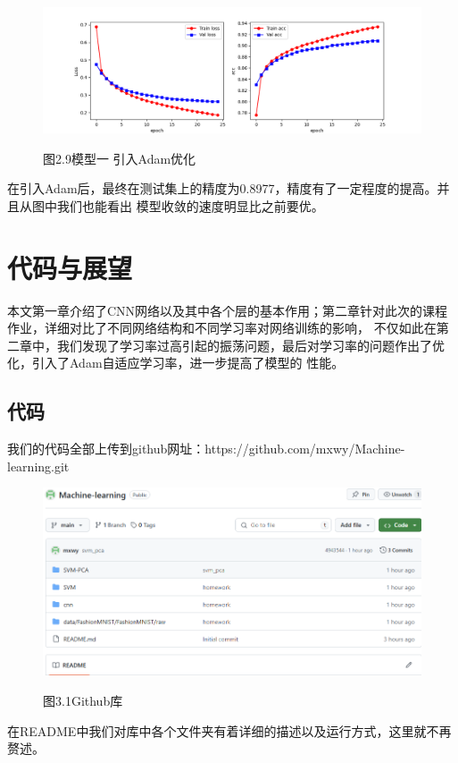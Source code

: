 \documentclass[10.5pt,compsoc,UTF8]{CjC}
\theoremstyle{mystyle}
\begin{document}
\begin{figure}[htbp]
\centering
\vspace {-6mm}
\centerline{\includegraphics[width=1\linewidth]{CNN30.png}}
\heiti 图2.9\quad  模型一 引入Adam优化
\end{figure}
  
在引入Adam后，最终在测试集上的精度为0.8977，精度有了一定程度的提高。并且从图中我们也能看出
模型收敛的速度明显比之前要优。


\section{代码与展望}
本文第一章介绍了CNN网络以及其中各个层的基本作用；第二章针对此次的课程作业，详细对比了不同网络结构和不同学习率对网络训练的影响，
不仅如此在第二章中，我们发现了学习率过高引起的振荡问题，最后对学习率的问题作出了优化，引入了Adam自适应学习率，进一步提高了模型的
性能。
\subsection{代码}

我们的代码全部上传到github网址：https://github.com/mxwy/Machine-learning.git

\begin{figure}[htbp]
\centering

\centerline{\includegraphics[width=0.8\linewidth]{github1.png}}
\heiti 图3.1\quad  Github库
\end{figure}

在README中我们对库中各个文件夹有着详细的描述以及运行方式，这里就不再赘述。
\end{document}
